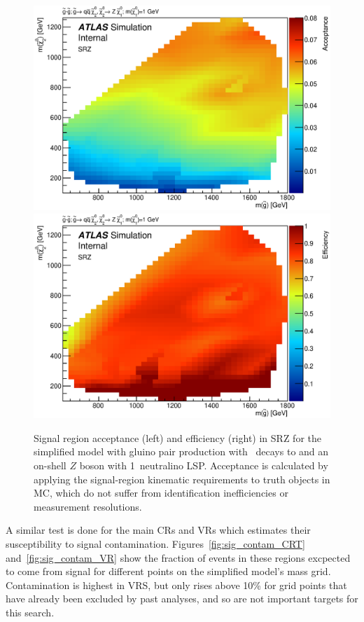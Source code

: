 \begin{figure}[ht]
\centering
\includegraphics[width=.48\textwidth]{figures/signalacceptcontam/acc_SM_GG_N2_1.eps}
\includegraphics[width=.48\textwidth]{figures/signalacceptcontam/eff_SM_GG_N2_1.eps}
\caption{
Signal region acceptance (left) and efficiency (right) in SRZ for the simplified model with gluino pair production with \chitwozero\ decays to \chionezero and an on-shell $Z$ boson with 1\gev~neutralino LSP.  
Acceptance is calculated by applying the signal-region kinematic requirements to truth objects in \ac{MC}, which do not suffer from identification inefficiencies or measurement resolutions.
}
\label{fig:acc_SMGGN2_1_z}
\end{figure}

A similar test is done for the main \acp{CR} and \acp{VR} which estimates their susceptibility to signal contamination. Figures~\ref{fig:sig_contam_CRT} and~\ref{fig:sig_contam_VR} show the fraction of events in these regions excpected to come from signal for different points on the simplified model's mass grid. Contamination is highest in VRS, but only rises above 10\% for grid points that have already been excluded by past analyses, and so are not important targets for this search.

